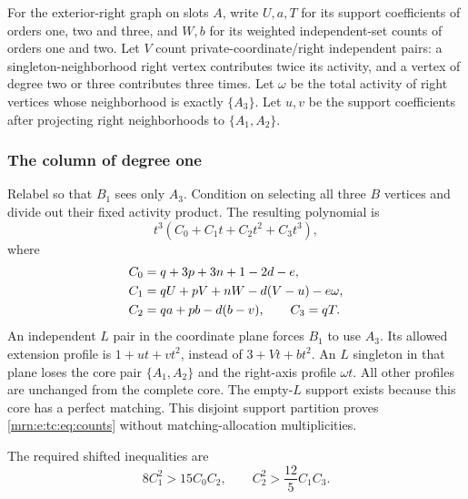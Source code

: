\documentclass[11pt,a4paper]{article}
\theoremstyle{remark}\newtheorem{remark}[theorem]{Remark}
\begin{document}
For the exterior-right graph on slots $A$, write $U,a,T$ for its support coefficients of orders one, two and three, and $W,b$ for its weighted independent-set counts of orders one and two. Let $V$ count private-coordinate/right independent pairs: a singleton-neighborhood right vertex contributes twice its activity, and a vertex of degree two or three contributes three times. Let $\omega$ be the total activity of right vertices whose neighborhood is exactly $\{A_3\}$. Let $u,v$ be the support coefficients after projecting right neighborhoods to $\{A_1,A_2\}$.

\subsubsection{The column of degree one}
Relabel so that $B_1$ sees only $A_3$. Condition on selecting all three $B$ vertices and divide out their fixed activity product. The resulting polynomial is
\[
 t^3(C_0+C_1t+C_2t^2+C_3t^3),
\]
where
\begin{align}
 C_0&=q+3p+3n+1-2d-e, \label{mrn:e:tc:eq:counts}\\
 C_1&=qU+pV+nW-d(V-u)-e\omega,\notag\\
 C_2&=qa+pb-d(b-v),\qquad C_3=qT.\notag
\end{align}
An independent $L$ pair in the coordinate plane forces $B_1$ to use $A_3$. Its allowed extension profile is $1+ut+vt^2$, instead of $3+Vt+bt^2$. An $L$ singleton in that plane loses the core pair $\{A_1,A_2\}$ and the right-axis profile $\omega t$. All other profiles are unchanged from the complete core. The empty-$L$ support exists because this core has a perfect matching. This disjoint support partition proves \eqref{mrn:e:tc:eq:counts} without matching-allocation multiplicities.

The required shifted inequalities are
\begin{equation}\label{mrn:e:tc:eq:targets}
 8C_1^2>15C_0C_2,\qquad C_2^2>\frac{12}{5}C_1C_3.
\end{equation}
\end{document}
